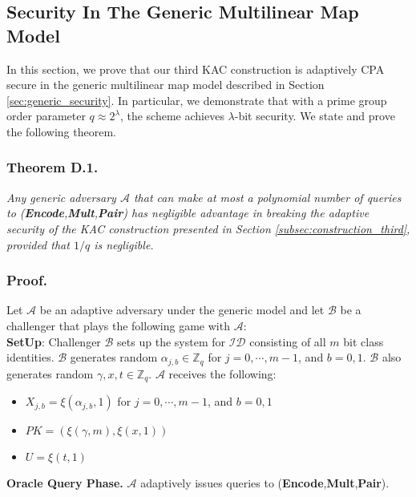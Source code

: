 \subsection{Security In The Generic Multilinear Map Model}
\label{app_sec:proofgeneric}

In this section, we prove that our third KAC construction is adaptively CPA secure in the generic multilinear map model described in Section \ref{sec:generic_security}. In particular, we demonstrate that with a prime group order parameter $q\approx 2^{\lambda}$, the scheme achieves $\lambda$-bit security. We state and prove the following theorem.

\subsubsection{Theorem D.1.} \textit{Any generic adversary $\mathcal{A}$ that can make at most a polynomial number of queries to (\textbf{Encode},\textbf{Mult},\textbf{Pair}) has negligible advantage in breaking the adaptive security of the KAC construction presented in Section \ref{subsec:construction_third}, provided that $1/q$ is negligible.}

\subsubsection{Proof.} Let $\mathcal{A}$ be an adaptive adversary under the generic model and let $\mathcal{B}$ be a challenger that plays the following game with $\mathcal{A}$:\\

\noindent\textbf{SetUp}: Challenger $\mathcal{B}$ sets up the system for $\mathcal{ID}$ consisting of all $m$ bit class identities. $\mathcal{B}$ generates random $\alpha_{j,b}\in\mathbb{Z}_q$ for $j=0,\cdots,m-1$, and $b=0,1$. $\mathcal{B}$ also generates random $\gamma,x,t\in\mathbb{Z}_q$. $\mathcal{A}$ receives the following:

\begin{itemize}
 \item $X_{j,b}=\xi({\alpha_{j,b}},1)$ for $j=0,\cdots,m-1$, and $b=0,1$
 \item $PK=(\xi({\gamma},{m}),\xi(x,1))$ 
 \item $U=\xi(t,{1})$
\end{itemize}

\noindent\textbf{Oracle Query Phase.} $\mathcal{A}$ adaptively issues queries to (\textbf{Encode},\textbf{Mult},\textbf{Pair}).\\

